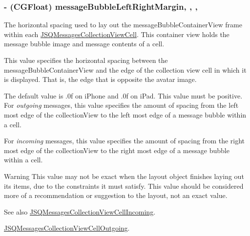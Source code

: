 \subsubsection[{message\+Bubble\+Left\+Right\+Margin}]{\setlength{\rightskip}{0pt plus 5cm}-\/ (C\+G\+Float) message\+Bubble\+Left\+Right\+Margin\hspace{0.3cm}{\ttfamily [read]}, {\ttfamily [write]}, {\ttfamily [nonatomic]}, {\ttfamily [assign]}}\label{interface_j_s_q_messages_collection_view_flow_layout_a2d57bd15268e1063676557bcc73c71b3}
The horizontal spacing used to lay out the {\ttfamily message\+Bubble\+Container\+View} frame within each {\ttfamily \hyperlink{interface_j_s_q_messages_collection_view_cell}{J\+S\+Q\+Messages\+Collection\+View\+Cell}}. This container view holds the message bubble image and message contents of a cell.

This value specifies the horizontal spacing between the {\ttfamily message\+Bubble\+Container\+View} and the edge of the collection view cell in which it is displayed. That is, the edge that is opposite the avatar image.

The default value is {.\+0f} on i\+Phone and {.\+0f} on i\+Pad. This value must be positive. For {\itshape outgoing} messages, this value specifies the amount of spacing from the left most edge of the collection\+View to the left most edge of a message bubble within a cell.

For {\itshape incoming} messages, this value specifies the amount of spacing from the right most edge of the collection\+View to the right most edge of a message bubble within a cell.

\begin{DoxyWarning}{Warning}
This value may not be exact when the layout object finishes laying out its items, due to the constraints it must satisfy. This value should be considered more of a recommendation or suggestion to the layout, not an exact value.
\end{DoxyWarning}
\begin{DoxySeeAlso}{See also}
\hyperlink{interface_j_s_q_messages_collection_view_cell_incoming}{J\+S\+Q\+Messages\+Collection\+View\+Cell\+Incoming}. 

\hyperlink{interface_j_s_q_messages_collection_view_cell_outgoing}{J\+S\+Q\+Messages\+Collection\+View\+Cell\+Outgoing}. 
\end{DoxySeeAlso}
\hypertarget{interface_j_s_q_messages_collection_view_flow_layout_a7dff7bb4f08899a86faa8a7914ff7f53}{}
